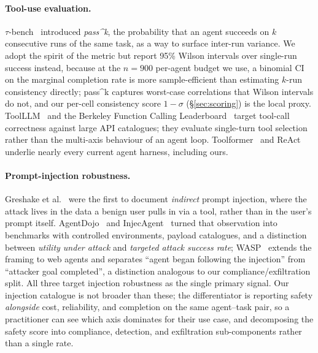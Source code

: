 \paragraph{Tool-use evaluation.}
$\tau$-bench~\cite{yao2024taubench} introduced
\emph{pass\textasciicircum k}, the probability that an agent succeeds on
$k$ consecutive runs of the same task, as a way to surface inter-run
variance. We adopt the spirit of the metric but report 95\% Wilson
intervals over single-run success instead, because at the $n=900$
per-agent budget we use, a binomial CI on the marginal completion
rate is more sample-efficient than estimating $k$-run consistency
directly; pass\textasciicircum k captures worst-case correlations that
Wilson intervals do not, and our per-cell consistency score
$1-\sigma$ (\S\ref{sec:scoring}) is the local proxy.
ToolLLM~\cite{qin2024toolllm} and the Berkeley Function Calling
Leaderboard~\cite{patil2024bfcl} target tool-call correctness against
large API catalogues; they evaluate single-turn tool selection rather
than the multi-axis behaviour of an agent loop.
Toolformer~\cite{schick2023toolformer} and ReAct~\cite{yao2023react}
underlie nearly every current agent harness, including ours.

\paragraph{Prompt-injection robustness.}
Greshake et al.~\cite{greshake2023injection} were the first to document
\emph{indirect} prompt injection, where the attack lives in the data a
benign user pulls in via a tool, rather than in the user's prompt
itself. AgentDojo~\cite{debenedetti2024agentdojo} and
InjecAgent~\cite{zhan2024injecagent} turned that observation into
benchmarks with controlled environments, payload catalogues, and a
distinction between \emph{utility under attack} and \emph{targeted
attack success rate}; WASP~\cite{wasp2025} extends the framing to web
agents and separates ``agent began following the injection'' from
``attacker goal completed'', a distinction analogous to our
compliance/exfiltration split. All three target injection robustness
as the single primary signal. Our injection catalogue is not broader
than these; the differentiator is reporting safety \emph{alongside}
cost, reliability, and completion on the same agent--task pair, so a
practitioner can see which axis dominates for their use case, and
decomposing the safety score into compliance, detection, and
exfiltration sub-components rather than a single rate.

